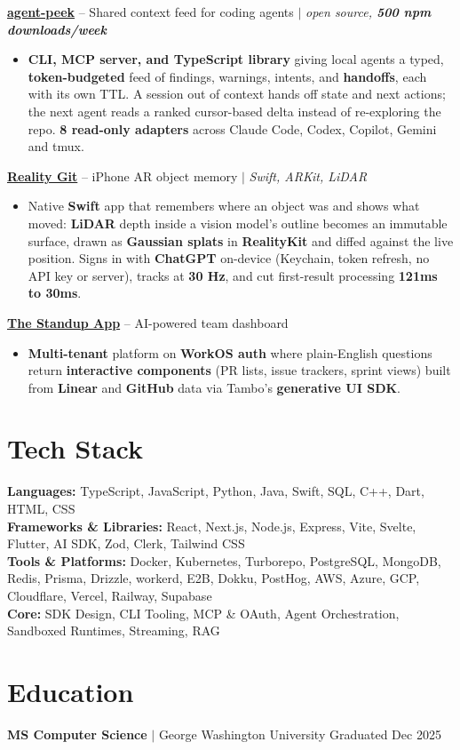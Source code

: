 \documentclass[10pt,a4paper]{article}
\begin{document}
\textbf{\href{https://github.com/akhileshrangani4/agent-peek}{agent-peek}} -- Shared context feed for coding agents $|$ \textit{open source, \textbf{500 npm downloads/week}}
\begin{itemize}
    \item \textbf{CLI, MCP server, and TypeScript library} giving local agents a typed, \textbf{token-budgeted} feed of findings, warnings, intents, and \textbf{handoffs}, each with its own TTL. A session out of context hands off state and next actions; the next agent reads a ranked cursor-based delta instead of re-exploring the repo. \textbf{8 read-only adapters} across Claude Code, Codex, Copilot, Gemini and tmux.
\end{itemize}

\textbf{\href{https://github.com/akhileshrangani4/reality-git}{Reality Git}} -- iPhone AR object memory $|$ \textit{Swift, ARKit, LiDAR}
\begin{itemize}
    \item Native \textbf{Swift} app that remembers where an object was and shows what moved: \textbf{LiDAR} depth inside a vision model's outline becomes an immutable surface, drawn as \textbf{Gaussian splats} in \textbf{RealityKit} and diffed against the live position. Signs in with \textbf{ChatGPT} on-device (Keychain, token refresh, no API key or server), tracks at \textbf{30 Hz}, and cut first-result processing \textbf{121ms to 30ms}.
\end{itemize}

\textbf{\href{https://github.com/tambo-labs/thestandupapp}{The Standup App}} -- AI-powered team dashboard
\begin{itemize}
    \item \textbf{Multi-tenant} platform on \textbf{WorkOS auth} where plain-English questions return \textbf{interactive components} (PR lists, issue trackers, sprint views) built from \textbf{Linear} and \textbf{GitHub} data via Tambo's \textbf{generative UI SDK}.
\end{itemize}

\section{Tech Stack}

\textbf{Languages:} TypeScript, JavaScript, Python, Java, Swift, SQL, C++, Dart, HTML, CSS \\
\textbf{Frameworks \& Libraries:} React, Next.js, Node.js, Express, Vite, Svelte, Flutter, AI SDK, Zod, Clerk, Tailwind CSS \\
\textbf{Tools \& Platforms:} Docker, Kubernetes, Turborepo, PostgreSQL, MongoDB, Redis, Prisma, Drizzle, workerd, E2B, Dokku, PostHog, AWS, Azure, GCP, Cloudflare, Vercel, Railway, Supabase \\
\textbf{Core:} SDK Design, CLI Tooling, MCP \& OAuth, Agent Orchestration, Sandboxed Runtimes, Streaming, RAG

\section{Education}

\textbf{MS Computer Science} $|$ George Washington University \hfill Graduated Dec 2025
\end{document}
